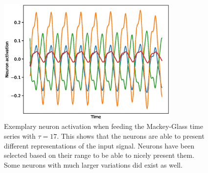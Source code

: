 \begin{figure}[H]
\begin{center}
\includegraphics[width=0.8\textwidth]{Pictures/MackeyGlassNeuronExample.eps}
\end{center}
\caption{Exemplary neuron activation when feeding the Mackey-Glass time series with $\tau = 17$. This shows that the neurons are able to present different representations of the input signal. Neurons have been selected based on their range to be able to nicely present them. Some neurons with much larger variations did exist as well.} 
\label{A:NeuronActivation}
\end{figure}


\newpage